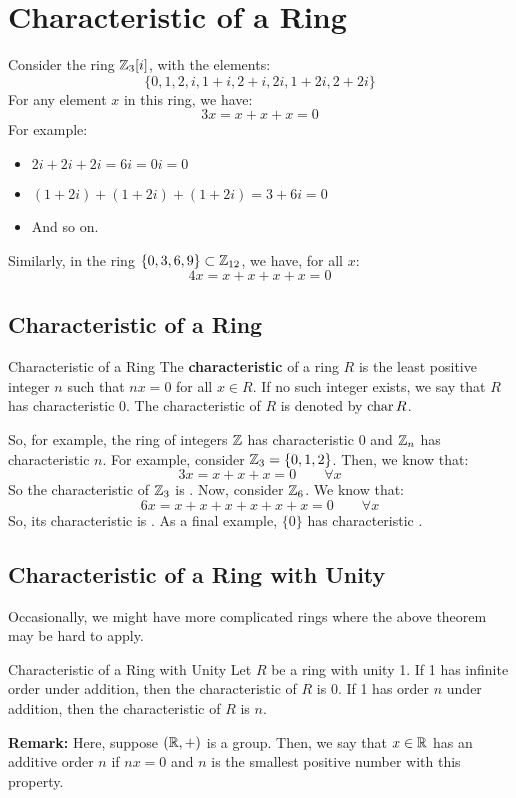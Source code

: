 \documentclass[letterpaper]{article}
\begin{document}
\section{Characteristic of a Ring}
Consider the ring $\mathbb{Z}_{3}[i]$, with the elements:
\[\{0, 1, 2, i, 1 + i, 2 + i, 2i, 1 + 2i, 2 + 2i\}\]
For any element $x$ in this ring, we have: 
\[3x = x + x + x = 0\]
For example:
\begin{itemize}
    \item $2i + 2i + 2i = 6i = 0i = 0$
    \item $(1 + 2i) + (1 + 2i) + (1 + 2i) = 3 + 6i = 0$
    \item And so on.
\end{itemize}
Similarly, in the ring $\{0, 3, 6, 9\} \subset \mathbb{Z}_{12}$, we have, for all $x$: 
\[4x = x + x + x + x = 0\]

\subsection{Characteristic of a Ring}
\begin{definition}{Characteristic of a Ring}{}
    The \textbf{characteristic} of a ring $R$ is the least positive integer $n$ such that $nx = 0$ for all $x \in R$. If no such integer exists, we say that $R$ has characteristic 0. The characteristic of $R$ is denoted by $\operatorname{char}{R}$.    
\end{definition}
So, for example, the ring of integers $\mathbb{Z}$ has characteristic 0 and $\mathbb{Z}_n$ has characteristic $n$. For example, consider $\mathbb{Z}_{3} = \{0, 1, 2\}$. Then, we know that:
\[3x = x + x + x = 0 \qquad \forall x\]
So the characteristic of $\mathbb{Z}_{3}$ is . Now, consider $\mathbb{Z}_{6}$. We know that:
\[6x = x + x + x + x + x + x = 0 \qquad \forall x\]
So, its characteristic is . As a final example, $\{0\}$ has characteristic .

\subsection{Characteristic of a Ring with Unity}
Occasionally, we might have more complicated rings where the above theorem may be hard to apply. 
\begin{theorem}{Characteristic of a Ring with Unity}{}
    Let $R$ be a ring with unity 1. If 1 has infinite order under addition, then the characteristic of $R$ is 0. If 1 has order $n$ under addition, then the characteristic of $R$ is $n$. 
\end{theorem}
\textbf{Remark:} Here, suppose $(\mathbb{R}, +)$ is a group. Then, we say that $x \in \mathbb{R}$ has an additive order $n$ if $nx = 0$ and $n$ is the smallest positive number with this property. 
\end{document}
